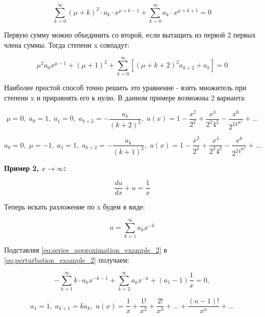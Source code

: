 	\begin{equation}
		\sum_{k=0}^\infty (\mu + k)^2 \cdot a_k \cdot x^{\mu + k - 1}
		+ \sum_{k = 0}^\infty a_k \cdot x ^ {\mu + k + 1} = 0
	\end{equation}
	
	Первую сумму можно объединить со второй, если вытащить из первой 2 первых члена суммы. Тогда степени x совпадут:
	
	\begin{equation}
		\mu^2 a_0 x^{\mu-1} + (\mu + 1)^2 + \sum_{k=0}^\infty \left [ (\mu + k + 2)^2 a_{k+2} + a_k \right] = 0
	\end{equation}
	
	Наиболее простой способ точно решить это уравнение - взять множитель при степени x и приравнять его к нулю. В данном примере возможны 2 варианта:
	
	\begin{equation}
		\mu = 0, \;
		a_0 = 1, \;
		a_1 = 0, \;
		a_{k+2} = -\frac{a_k}{(k+2)^2}, \;
		u(x) = 1 - \frac {x^2} {2^2} + \frac{x^4}{2^2 4^2} - \frac {x^6}{2^24^26^2} + \dots
	\end{equation}
	
	\begin{equation}
		a_0 = 0, \;
		\mu = -1, \;
		a_1 = 1, \;
		a_{k+2} = - \frac {a_k} {(k+1)^2}, \;
		u(x) = 1 - \frac {x^2} {2^2} + \frac{x^4}{2^2 4^2} - \frac {x^6}{2^24^26^2} + \dots
	\end{equation}
	
	\textbf{Пример 2, $x \to \infty$:}
	
	\begin{equation}
		\frac {du} {dx} + u = \frac 1 x
		\label{eq:perturbation_example_2}
	\end{equation}
	
	Теперь искать разложение по x будем в виде:
	
	\begin{equation}
		u = \sum_{k=1}^\infty a_k x^{-k}
		\label{eq:series_approximation_example_2}
	\end{equation}
	
	Подставляя \eqref{eq:series_approximation_example_2} в \eqref{eq:perturbation_example_2} получаем:
	
	\begin{equation}
		- \sum_{k=1}^\infty k \cdot a_k x^{-k-1} + \sum_{k=2}^\infty a_k x^{-k} + (a_1 - 1) \frac 1 x = 0,
	\end{equation}
	
	\begin{equation}
		a_1 = 1, \; a_{k+1} = ka_k, \; u(x) = \frac 1 x + \frac {1!} {x^2} + \frac {2!}{x^3} + \dots + \frac {(n-1)!}{x^n} + \dots
	\end{equation}
	
